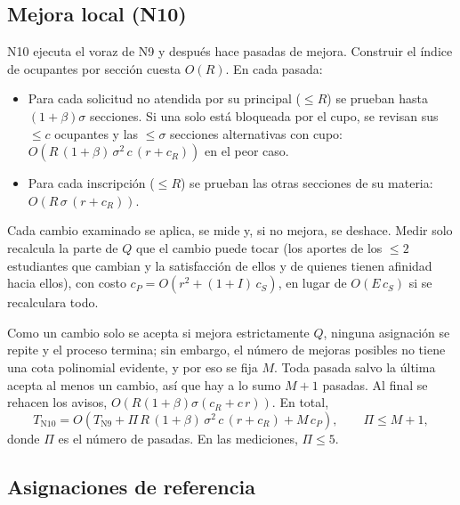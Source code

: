 \subsection{Mejora local (N10)}

N10 ejecuta el voraz de N9 y después hace pasadas de mejora. Construir el índice de ocupantes por sección cuesta $O(R)$. En cada pasada:
\begin{itemize}
\item Para cada solicitud no atendida por su principal ($\le R$) se prueban hasta $(1+\beta)\sigma$ secciones. Si una solo está bloqueada por el cupo, se revisan sus $\le c$ ocupantes y las $\le \sigma$ secciones alternativas con cupo: $O(R\,(1+\beta)\,\sigma^2\, c\,(r + c_R))$ en el peor caso.
\item Para cada inscripción ($\le R$) se prueban las otras secciones de su materia: $O(R\,\sigma\,(r + c_R))$.
\end{itemize}
Cada cambio examinado se aplica, se mide y, si no mejora, se deshace. Medir solo recalcula la parte de $Q$ que el cambio puede tocar (los aportes de los $\le 2$ estudiantes que cambian y la satisfacción de ellos y de quienes tienen afinidad hacia ellos), con costo $c_P = O(r^2 + (1+I)\,c_S)$, en lugar de $O(E\,c_S)$ si se recalculara todo.

Como un cambio solo se acepta si mejora estrictamente $Q$, ninguna asignación se repite y el proceso termina; sin embargo, el número de mejoras posibles no tiene una cota polinomial evidente, y por eso se fija $M$. Toda pasada salvo la última acepta al menos un cambio, así que hay a lo sumo $M+1$ pasadas. Al final se rehacen los avisos, $O(R(1+\beta)\sigma(c_R + c\,r))$. En total,
\[
T_{\mathrm{N10}} = O\!\left(T_{\mathrm{N9}} + \Pi\, R\,(1+\beta)\,\sigma^2\, c\,(r + c_R) + M\, c_P\right), \qquad \Pi \le M + 1,
\]
donde $\Pi$ es el número de pasadas. En las mediciones, $\Pi \le 5$.

\subsection{Asignaciones de referencia}

